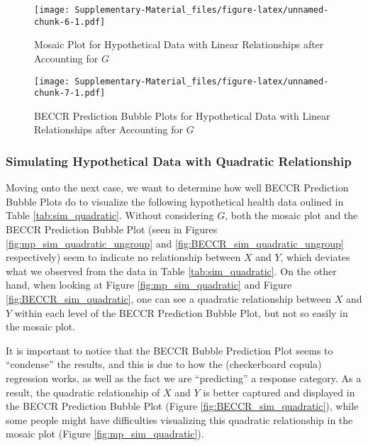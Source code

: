 \documentclass[
]{article}
\begin{document}
\begin{figure}
\centering
\texttt{[image: Supplementary-Material\_files/figure-latex/unnamed-chunk-6-1.pdf]}
\caption{\label{fig:mp_sim_SLR}Mosaic Plot for Hypothetical Data with
Linear Relationships after Accounting for \(G\)}
\end{figure}

\begin{figure}
\centering
\texttt{[image: Supplementary-Material\_files/figure-latex/unnamed-chunk-7-1.pdf]}
\caption{\label{fig:BECCR_sim_SLR}BECCR Prediction Bubble Plots for
Hypothetical Data with Linear Relationships after Accounting for \(G\)}
\end{figure}

\subsubsection{Simulating Hypothetical Data with Quadratic
Relationship}\label{simulating-hypothetical-data-with-quadratic-relationship}

Moving onto the next case, we want to determine how well BECCR
Prediction Bubble Plots do to visualize the following hypothetical
health data oulined in Table \ref{tab:sim_quadratic}. Without
considering \(G\), both the mosaic plot and the BECCR Prediction Bubble
Plot (seen in Figures \ref{fig:mp_sim_quadratic_ungroup} and
\ref{fig:BECCR_sim_quadratic_ungroup} respectively) seem to indicate no
relationship between \(X\) and \(Y\), which deviates what we observed
from the data in Table \ref{tab:sim_quadratic}. On the other hand, when
looking at Figure \ref{fig:mp_sim_quadratic} and Figure
\ref{fig:BECCR_sim_quadratic}, one can see a quadratic relationship
between \(X\) and \(Y\) within each level of the BECCR Prediction Bubble
Plot, but not so easily in the mosaic plot.

It is important to notice that the BECCR Bubble Prediction Plot seems to
``condense'' the results, and this is due to how the (checkerboard
copula) regression works, as well as the fact we are ``predicting'' a
response category. As a result, the quadratic relationship of \(X\) and
\(Y\) is better captured and displayed in the BECCR Prediction Bubble
Plot (Figure \ref{fig:BECCR_sim_quadratic}), while some people might
have difficulties visualizing this quadratic relationship in the mosaic
plot (Figure \ref{fig:mp_sim_quadratic}).
\end{document}
